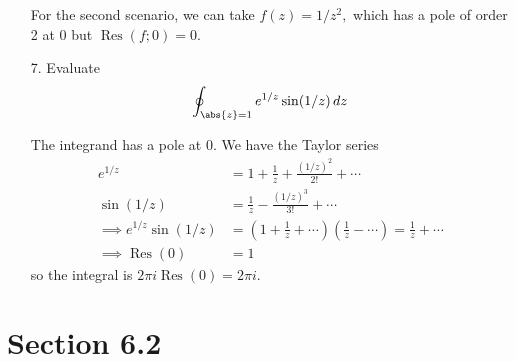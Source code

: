 \documentclass{article}
\DeclareMathOperator{\Res}{Res}
\begin{document}
\begin{itemize}
\begin{answer*}
			For the second scenario, we can take $f(z)=1/z^2,$ which has a pole of order 2 at 0 but $\Res(f; 0)=0.$
		\end{answer*}

	\item[7.] Evaluate
		\begin{align*}
			\oint_{\abs{z}=1} e^{1/z}\sin(1/z)\, dz
		\end{align*}
		\begin{soln}
			The integrand has a pole at 0. We have the Taylor series
			\begin{align*}
				e^{1/z} &= 1 + \frac{1}{z} + \frac{(1/z)^2}{2!} + \cdots \\
				\sin(1/z) &= \frac{1}{z} - \frac{(1/z)^3}{3!} + \cdots \\
				\implies e^{1/z}\sin(1/z) &= \left( 1+\frac{1}{z} + \cdots \right)\left( \frac{1}{z} - \cdots \right) = \frac{1}{z} + \cdots \\
				\implies \Res(0) &= 1
			\end{align*}
			so the integral is $2\pi i\Res(0)=2\pi i.$
		\end{soln}
		
\end{itemize}


\section*{Section 6.2}
\end{document}
